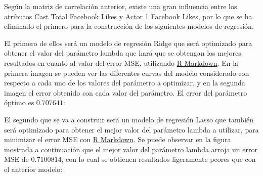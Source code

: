 \documentclass{article}
\begin{document}
Según la matriz de correlación anterior, existe una gran influencia entre los atributos Cast Total Facebook Likes y Actor 1 Facebook Likes, por lo que se ha eliminado el primero para la construcción de los siguientes modelos de regresión.

\clearpage

El primero de ellos será un modelo de regresión Ridge\cite{glmnet} que será optimizado para obtener el valor del parámetro lambda que hará que se obtengan los mejores resultados en cuanto al valor del error MSE, utilizando \href{https://github.com/pozueco/proyecto_fin_de_master/blob/master/model_supervised.md}{R Markdown}. En la primera imagen se pueden ver las diferentes curvas del modelo considerado con respecto a cada uno de los valores del parámetro a optimizar, y en la segunda imagen el error obtenido con cada valor del parámetro. El error del parámetro óptimo es $0.707641$:

\begin{figure}[h]
\centering
{}
\end{figure}

El segundo que se va a construir será un modelo de regresión Lasso\cite{glmnet} que también será optimizado para obtener el mejor valor del parámetro lambda a utilizar, para minimizar el error MSE con \href{https://github.com/pozueco/proyecto_fin_de_master/blob/master/model_supervised.md}{R Markdown}. Se puede observar en la figura mostrada a continuación que el mejor valor del parámetro lambda arroja un error MSE de $0.7100814$, con lo cual se obtienen resultados ligeramente peores que con el anterior modelo:
\end{document}
